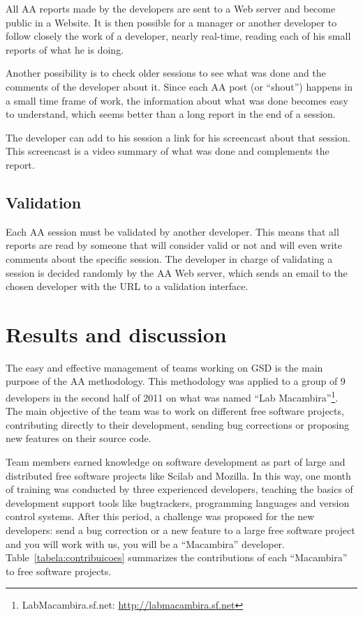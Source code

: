 \documentclass[letterpaper]{article}
\begin{document}
All AA reports made by the developers are sent to a Web server and become public
in a Website. It is then possible for a manager or another developer to follow
closely the work of a developer, nearly real-time, reading each of his
small reports of what he is doing.

Another possibility is to check older sessions to see what was done
and the comments of the developer about it. Since each AA post (or ``shout'') happens in a
small time frame of work, the information about what was done becomes easy
to understand, which seems better than a long report in the end of a session.

The developer can add to his session a link for his screencast
about that session. This screencast is a video summary of what was done and complements the report.

\subsection{Validation}
Each AA session must be validated by another developer. This means that all
reports are read by someone that will consider valid or not and will even
write comments about the specific session. The developer in charge of
validating a session is decided randomly by the AA Web server, which sends an
email to the chosen developer with the URL to a validation interface.


\section{Results and discussion}
\label{results}

The easy and effective management of teams working on GSD is the main purpose of
the AA methodology. This methodology was applied to a group of 9 developers in the second half of 2011 on what was named ``Lab Macambira''\footnote{LabMacambira.sf.net:
  \url{http://labmacambira.sf.net}}. The main objective of the team was to work
on different free software projects, contributing directly to their development,
sending bug corrections or proposing new features on their source code.

Team members earned knowledge on software development
as part of large and distributed free software projects like Scilab and  
Mozilla. In this way, one month of training was conducted by three experienced
developers, teaching the basics of development support tools like
bugtrackers, programming languages and version control systems. After this
period, a challenge was proposed for the new developers: send a bug correction
or a new feature to a large free software project and you will work with us, you
will be a ``Macambira'' developer. Table~\ref{tabela:contribuicoes} summarizes
the contributions of each ``Macambira'' to free software projects.
\end{document}
